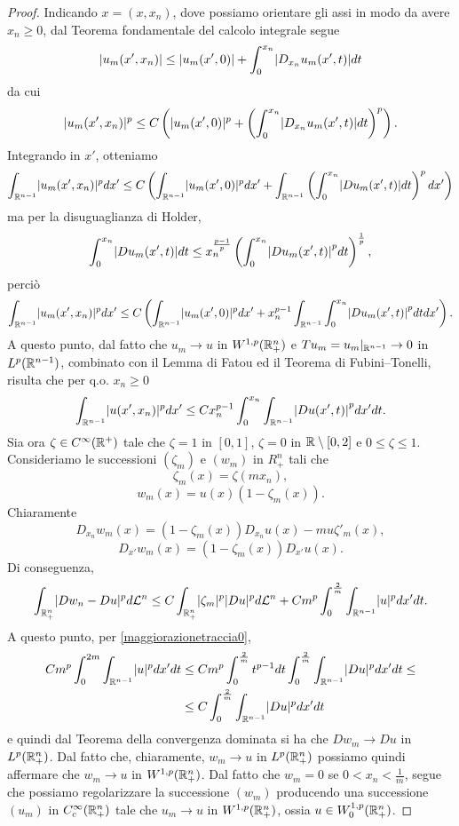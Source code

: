 \begin{proof}
	Indicando $x = (x,x_n)$, dove possiamo orientare gli assi in modo da avere $x_n \ge 0$, dal Teorema fondamentale del calcolo integrale segue
	\[ \abs{u_m(x',x_n)} \le \abs{u_m(x',0)}+ \int_{0}^{x_n} \abs*{D_{x_n}u_m(x',t)}dt \]
	da cui
	\[ \abs{u_m(x',x_n)}^p \le C\left(  \abs{u_m(x',0)}^p+ \left( \int_{0}^{x_n} \abs*{D_{x_n}u_m(x',t)}dt\right) ^p\right).  \]
	Integrando in $x'$, otteniamo
	\[ \int_{\R^{n-1}}\abs{u_m(x',x_n)}^p dx' \le C \left( \int_{\R^{n-1}} \abs{u_m(x',0)}^pdx'+ \int_{\R^{n-1}}\left( \int_{0}^{x_n} \abs*{Du_m(x',t)}dt\right) ^pdx'\right)  \]
	ma per la disuguaglianza di Holder,
	\[ \int_{0}^{x_n} \abs*{Du_m(x',t)}dt \le x_n^{\frac{p-1}{p}}\left( \int_{0}^{x_n}\abs*{Du_m(x',t)}^pdt\right)^{\frac{1}{p}},  \]
	perciò
	\[ 	\int_{\R^{n-1}}\abs{u_m(x',x_n)}^p dx' \le C \left( \int_{\R^{n-1}} \abs{u_m(x',0)}^pdx' + x_n^{p-1}\int_{\R^{n-1}} \int_{0}^{x_n}\abs*{Du_m(x',t)}^pdt dx'\right).  \]
	A questo punto, dal fatto che $u_m \to u$ in $W^{1,p}(\mathbb{R}^n_{+})$ e $Tu_m = u_m|_{\mathbb{R}^{n-1}} \to 0$ in $L^p(\mathbb{R}^{n-1})$, combinato con il Lemma di Fatou ed il Teorema di Fubini--Tonelli, risulta che per q.o. $x_n \ge 0$
	\begin{equation}\label{maggiorazionetraccia0}
		\int_{\R^{n-1}}\abs{u(x',x_n)}^p dx' \le C x_n^{p-1} \int_{0}^{x_n}\int_{\R^{n-1}}\abs*{Du(x',t)}^p dx'dt.
	\end{equation}
	Sia ora $\zeta \in C^\infty(\mathbb{R}^+)$ tale che $\zeta = 1$ in $[0,1]$, $\zeta = 0$ in $\mathbb{R}\setminus [0,2]$ e $0\le \zeta \le 1$. Consideriamo le successioni $(\zeta_m)$ e $(w_m)$ in $R^n_{+}$ tali che
	\[ \zeta_m(x) = \zeta(mx_n), \]
	\[ w_m(x) = u(x)(1-\zeta_m(x)). \]
	Chiaramente
	\[ D_{x_n}w_m(x) =  \left( 1-\zeta_m(x)\right)D_{x_n}u(x)  -mu \zeta'_m(x), \]
	\[ D_{x'}w_m(x) = \left( 1-\zeta_m(x)\right)D_{x'}u(x). \]
	Di conseguenza,
	\[ \int_{\mathbb{R}^n_+}\lvert Dw_n -Du\rvert^p d\mathcal{L}^n \le C \int_{\mathbb{R}^n_+}\lvert\zeta_m\rvert^p\lvert Du\rvert^pd\mathcal{L}^n + Cm^p\int_{0}^{\frac{2}{m}}\int_{\mathbb{R}^{n-1}}\lvert u\rvert^p dx'dt.  \]
	A questo punto, per \eqref{maggiorazionetraccia0},
	\begin{align*}
		Cm^p\int_{0}^{2m}\int_{\mathbb{R}^{n-1}}\lvert u\rvert^p dx'dt &\le C m^p \int_{0}^{\frac{2}{m}}t^{p-1}dt \int_{0}^{\frac{2}{m}}\int_{\mathbb{R}^{n-1}}\lvert Du\rvert^pdx'dt \le \\
		&\le C \int_{0}^{\frac{2}{m}}\int_{\mathbb{R}^{n-1}}\lvert Du\rvert^pdx'dt
	\end{align*}
	e quindi dal Teorema della convergenza dominata si ha che $Dw_m \to Du$ in $L^{p}(\mathbb{R}^n_{+})$. Dal fatto che, chiaramente, $w_m \to u$ in $L^{p}(\mathbb{R}^n_{+})$ possiamo quindi affermare che $w_m \to u$ in $W^{1,p}(\mathbb{R}^n_{+})$. Dal fatto che $w_m = 0 $ se $0 < x_n < \frac{1}{m}$, segue che possiamo regolarizzare la successione $(w_m)$ producendo una successione $(u_m)$ in $C^\infty_c(\mathbb{R}^n_{+})$ tale che $u_m \to u$ in $W^{1,p}(\mathbb{R}^n_{+})$, ossia $u \in W^{1,p}_0(\mathbb{R}^n_{+})$.
\end{proof}
